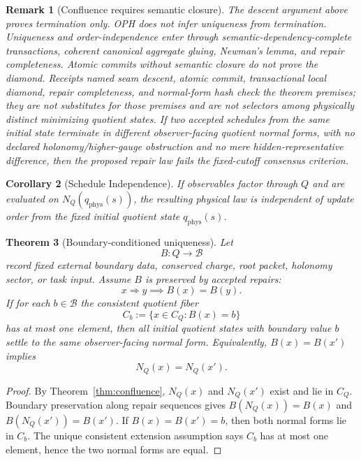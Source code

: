 \documentclass[11pt]{article}
\newtheorem{theorem}{Theorem}[section]
\newtheorem{corollary}[theorem]{Corollary}
\newtheorem{remark}[theorem]{Remark}
\begin{document}
\begin{remark}[Confluence requires semantic closure]
The descent argument above proves termination only. OPH does not infer uniqueness from termination.
Uniqueness and order-independence enter through semantic-dependency-complete transactions,
coherent canonical aggregate gluing, Newman's lemma, and repair completeness. Atomic commits
without semantic closure do not prove the diamond. Receipts named seam descent, atomic commit,
transactional local diamond, repair completeness, and normal-form hash check the theorem premises;
they are not substitutes for those premises and are not selectors among
physically distinct minimizing quotient states. If two accepted schedules from the same initial
state terminate in different observer-facing quotient normal forms, with no declared
holonomy/higher-gauge obstruction and no mere hidden-representative difference, then the proposed
repair law fails the fixed-cutoff consensus criterion.
\end{remark}

\begin{corollary}[Schedule Independence]
If observables factor through \(Q\) and are evaluated on \(N_Q(q_{\mathrm{phys}}(s))\), the
resulting physical law is independent of update order from the fixed initial quotient state
\(q_{\mathrm{phys}}(s)\).
\end{corollary}

\begin{theorem}[Boundary-conditioned uniqueness]\label{thm:boundary-conditioned-uniqueness}
Let
\[
B:Q\to\mathcal B
\]
record fixed external boundary data, conserved charge, root packet, holonomy sector, or task
input. Assume \(B\) is preserved by accepted repairs:
\[
x\Rightarrow y\implies B(x)=B(y).
\]
If for each \(b\in\mathcal B\) the consistent quotient fiber
\[
C_b:=\{x\in C_Q:B(x)=b\}
\]
has at most one element, then all initial quotient states with boundary value \(b\) settle to the
same observer-facing normal form. Equivalently, \(B(x)=B(x')\) implies
\[
N_Q(x)=N_Q(x').
\]
\end{theorem}

\begin{proof}
By Theorem~\ref{thm:confluence}, \(N_Q(x)\) and \(N_Q(x')\) exist and lie in \(C_Q\). Boundary
preservation along repair sequences gives \(B(N_Q(x))=B(x)\) and
\(B(N_Q(x'))=B(x')\). If \(B(x)=B(x')=b\), then both normal forms lie in \(C_b\). The unique
consistent extension assumption says \(C_b\) has at most one element, hence the two normal forms
are equal.
\end{proof}
\end{document}

